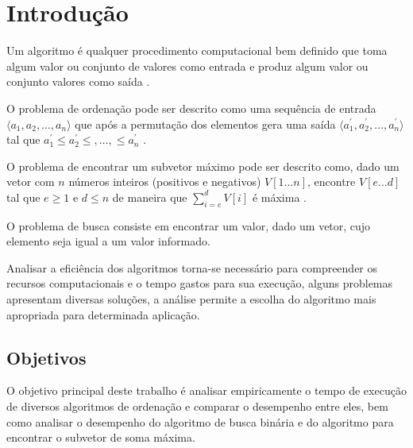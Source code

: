 \section{Introdução} \label{sec:introducao}
Um algoritmo é qualquer procedimento computacional bem definido que toma algum valor ou conjunto de valores como entrada e produz algum valor ou conjunto valores como saída \cite{cormen:01}.

O problema de ordenação pode ser descrito como uma sequência de entrada $\langle a_1, a_2, \ldots, a_n\rangle$ que após a permutação dos elementos gera uma saída $\langle a_1^{'}, a_2^{'}, \ldots, a_n^{'}\rangle$ tal que $a_1^{'}\leq a_2^{'}\leq, \ldots, \leq a_n^{'}$ \cite{cormen:01}.

O problema de encontrar um subvetor máximo pode ser descrito como, dado um vetor com $n$ números inteiros (positivos e negativos) $V[1...n]$, encontre $V[e...d]$ tal que $e \geq 1$ e $d \leq n$ de maneira que $\sum_{i=e}^{d}V[i]$ é máxima \cite{foleiss:01}.

O problema de busca consiste em encontrar um valor, dado um vetor, cujo elemento seja igual a um valor informado.

Analisar a eficiência dos algoritmos torna-se necessário para compreender os recursos computacionais e o tempo gastos para sua execução, alguns problemas apresentam diversas soluções, a análise permite a escolha do algoritmo mais apropriada para determinada aplicação.

\subsection{Objetivos}
O objetivo principal deste trabalho é analisar empiricamente o tempo de execução de diversos algoritmos de ordenação e comparar o desempenho entre eles, bem como analisar o desempenho do algoritmo de busca binária e do algoritmo para encontrar o subvetor de soma máxima.

